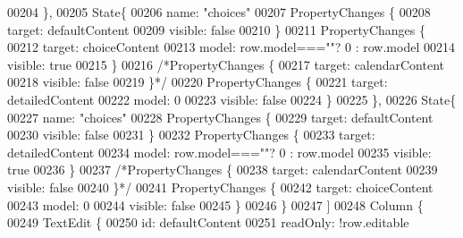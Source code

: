 \begin{DoxyCode}
00204                     \},
00205                     State\{
00206                         name: \textcolor{stringliteral}{"choices"}
00207                         PropertyChanges \{
00208                             target: defaultContent
00209                             visible: \textcolor{keyword}{false}
00210                         \}
00211                         PropertyChanges \{
00212                             target: choiceContent
00213                             model: row.model===\textcolor{stringliteral}{""}? 0  : row.model
00214                             visible: \textcolor{keyword}{true}
00215                         \}
00216                         \textcolor{comment}{/*PropertyChanges \{}
00217 \textcolor{comment}{                            target: calendarContent}
00218 \textcolor{comment}{                            visible: false}
00219 \textcolor{comment}{                        \}*/}
00220                         PropertyChanges \{
00221                             target: detailedContent
00222                             model: 0
00223                             visible: \textcolor{keyword}{false}
00224                         \}
00225                     \},
00226                     State\{
00227                         name: \textcolor{stringliteral}{"choices"}
00228                         PropertyChanges \{
00229                             target: defaultContent
00230                             visible: \textcolor{keyword}{false}
00231                         \}
00232                         PropertyChanges \{
00233                             target: detailedContent
00234                             model: row.model===\textcolor{stringliteral}{""}? 0  : row.model
00235                             visible: \textcolor{keyword}{true}
00236                         \}
00237                         \textcolor{comment}{/*PropertyChanges \{}
00238 \textcolor{comment}{                            target: calendarContent}
00239 \textcolor{comment}{                            visible: false}
00240 \textcolor{comment}{                        \}*/}
00241                         PropertyChanges \{
00242                             target: choiceContent
00243                             model: 0
00244                             visible: \textcolor{keyword}{false}
00245                         \}
00246                     \}
00247                 ]
00248                 Column \{
00249                     TextEdit \{
00250                         \textcolor{keywordtype}{id}: defaultContent
00251                         readOnly:  !row.editable

\end{DoxyCode}
